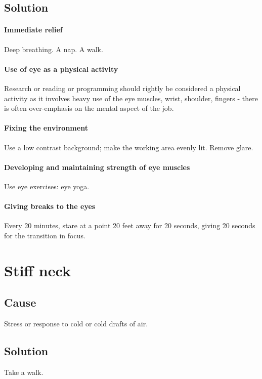\documentclass[oneside, article]{memoir}
\begin{document}
\subsection{Solution}
\paragraph*{Immediate relief}
Deep breathing. A nap. A walk.

\paragraph*{Use of eye as a physical activity}
Research or reading or programming should rightly be considered a physical activity as it involves heavy use of the eye muscles, wrist, shoulder, fingers - there is often over-emphasis on the mental aspect of the job. 

\paragraph*{Fixing the environment}
Use a low contrast background; make the working area evenly lit. Remove glare.

\paragraph*{Developing and maintaining strength of eye muscles}
Use eye exercises: eye yoga.

\paragraph*{Giving breaks to the eyes}
Every 20 minutes, stare at a point 20 feet away for 20 seconds, giving 20 seconds for the transition in focus.




\section{Stiff neck}
\subsection{Cause}
Stress or response to cold or cold drafts of air.

\subsection{Solution}
Take a walk.
\end{document}
